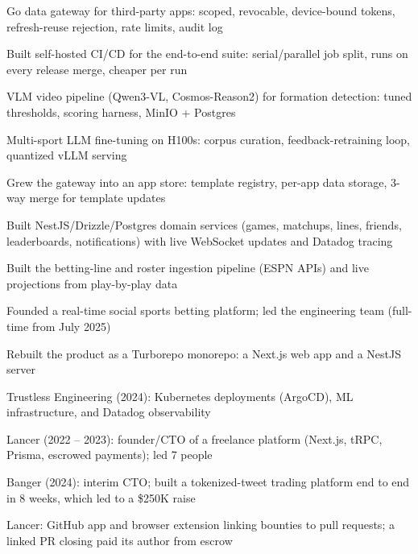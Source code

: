 \documentclass[print]{jack-resume}
\begin{document}
\begin{tightemize}
    \item Go data gateway for third-party apps: scoped, revocable, device-bound tokens, refresh-reuse rejection, rate limits, audit log
    \item Built self-hosted CI/CD for the end-to-end suite: serial/parallel job split, runs on every release merge, cheaper per run
    \item VLM video pipeline (Qwen3-VL, Cosmos-Reason2) for formation detection: tuned thresholds, scoring harness, MinIO + Postgres
    \item Multi-sport LLM fine-tuning on H100s: corpus curation, feedback-retraining loop, quantized vLLM serving
    \item Grew the gateway into an app store: template registry, per-app data storage, 3-way merge for template updates
\end{tightemize}
\sectionsep

\begin{tightemize}
    \item Built NestJS/Drizzle/Postgres domain services (games, matchups, lines, friends, leaderboards, notifications) with live WebSocket updates and Datadog tracing
    \item Built the betting-line and roster ingestion pipeline (ESPN APIs) and live projections from play-by-play data
    \item Founded a real-time social sports betting platform; led the engineering team (full-time from July 2025)
    \item Rebuilt the product as a Turborepo monorepo: a Next.js web app and a NestJS server
\end{tightemize}
\sectionsep

\begin{tightemize}
    \item Trustless Engineering (2024): Kubernetes deployments (ArgoCD), ML infrastructure, and Datadog observability
    \item Lancer (2022 -- 2023): founder/CTO of a freelance platform (Next.js, tRPC, Prisma, escrowed payments); led 7 people
    \item Banger (2024): interim CTO; built a tokenized-tweet trading platform end to end in 8 weeks, which led to a \$250K raise
    \item Lancer: GitHub app and browser extension linking bounties to pull requests; a linked PR closing paid its author from escrow
\end{tightemize}
\sectionsep
\end{document}
